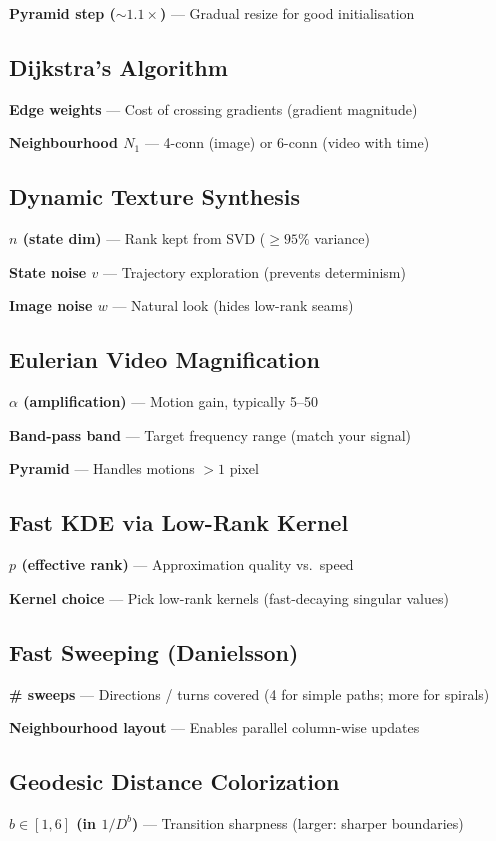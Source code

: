 \documentclass[10pt]{article}
\begin{document}
\textbf{Pyramid step ($\sim1.1\times$)} --- Gradual resize for good initialisation

\subsection*{Dijkstra's Algorithm}
\textbf{Edge weights} --- Cost of crossing gradients (gradient magnitude)

\textbf{Neighbourhood $N_1$} --- 4-conn (image) or 6-conn (video with time)

\subsection*{Dynamic Texture Synthesis}
\textbf{$n$ (state dim)} --- Rank kept from SVD ($\ge95\%$ variance)

\textbf{State noise $v$} --- Trajectory exploration (prevents determinism)

\textbf{Image noise $w$} --- Natural look (hides low-rank seams)

\subsection*{Eulerian Video Magnification}
\textbf{$\alpha$ (amplification)} --- Motion gain, typically 5--50

\textbf{Band-pass band} --- Target frequency range (match your signal)

\textbf{Pyramid} --- Handles motions $>1$ pixel

\subsection*{Fast KDE via Low-Rank Kernel}
\textbf{$p$ (effective rank)} --- Approximation quality vs.\ speed

\textbf{Kernel choice} --- Pick low-rank kernels (fast-decaying singular values)

\subsection*{Fast Sweeping (Danielsson)}
\textbf{\# sweeps} --- Directions / turns covered (4 for simple paths; more for spirals)

\textbf{Neighbourhood layout} --- Enables parallel column-wise updates

\subsection*{Geodesic Distance Colorization}
\textbf{$b \in [1,6]$ (in $1/D^b$)} --- Transition sharpness (larger: sharper boundaries)
\end{document}
